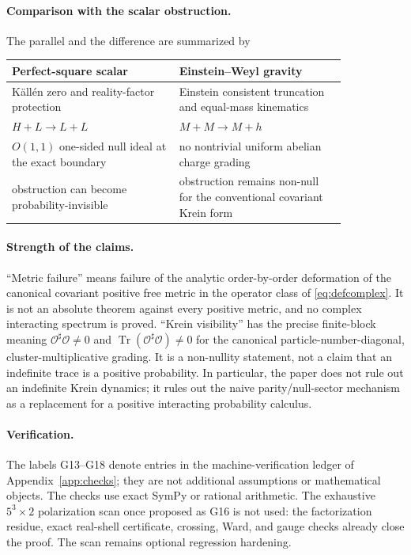 \documentclass[11pt]{article}
\theoremstyle{definition}
\theoremstyle{remark}
\newcommand{\Tr}{\operatorname{Tr}}
\begin{document}
\paragraph{Comparison with the scalar obstruction.}
The parallel and the difference are summarized by
\begin{center}
\begin{tabular}{p{0.42\linewidth}|p{0.42\linewidth}}
\hline
Perfect-square scalar & Einstein--Weyl gravity\\
\hline
K\"all\'en zero and reality-factor protection & Einstein consistent
truncation and equal-mass kinematics\\
$H+L\to L+L$ & $M+M\to M+h$\\
$O(1,1)$ one-sided null ideal at the exact boundary & no nontrivial
uniform abelian charge grading\\
obstruction can become probability-invisible & obstruction remains
non-null for the conventional covariant Krein form\\
\hline
\end{tabular}
\end{center}

\paragraph{Strength of the claims.}
``Metric failure'' means failure of the analytic order-by-order
deformation of the canonical covariant positive free metric in the
operator class of \eqref{eq:defcomplex}.  It is not an absolute theorem
against every positive metric, and no complex interacting spectrum is
proved.  ``Krein visibility'' has the precise finite-block meaning
$\mathcal O^\sharp\mathcal O\ne0$ and
$\Tr(\mathcal O^\sharp\mathcal O)\ne0$ for the canonical
particle-number-diagonal, cluster-multiplicative grading.  It is a
non-nullity statement,
not a claim that an indefinite trace is a positive probability.  In
particular, the paper does not rule out an indefinite Krein dynamics;
it rules out the naive parity/null-sector mechanism as a replacement for
a positive interacting probability calculus.

\paragraph{Verification.}
The labels G13--G18 denote entries in the machine-verification ledger of
Appendix~\ref{app:checks}; they are not additional assumptions or
mathematical objects.  The checks use exact SymPy or rational arithmetic.
The exhaustive $5^3\times2$ polarization scan once proposed as G16 is
not used:
the factorization residue, exact real-shell certificate, crossing, Ward,
and gauge checks already close the proof.  The scan remains optional
regression hardening.
\end{document}
